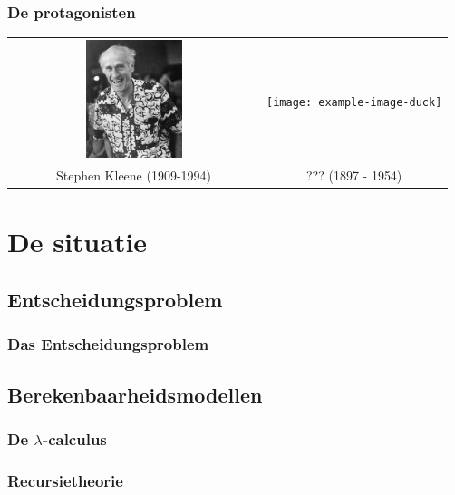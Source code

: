 \documentclass{beamer}
\begin{document}
\begin{frame}
    \frametitle{De protagonisten}
    \begin{tabular*}{\textwidth}{c c}
        \includegraphics[width=0.4\textwidth]{Kleene.jpeg} & \texttt{[image: example-image-duck]} \\
        {\large Stephen Kleene} (1909-1994) & {\large ???} (1897 - 1954)\\
    \end{tabular*}
\end{frame}

\section{De situatie}
\subsection{Entscheidungsproblem}
\begin{frame}
    \frametitle{Das Entscheidungsproblem}
\end{frame}

\subsection{Berekenbaarheidsmodellen}
\begin{frame}
    \frametitle{De $\lambda$-calculus}
\end{frame}

\begin{frame}
    \frametitle{Recursietheorie}
\end{frame}
\end{document}
